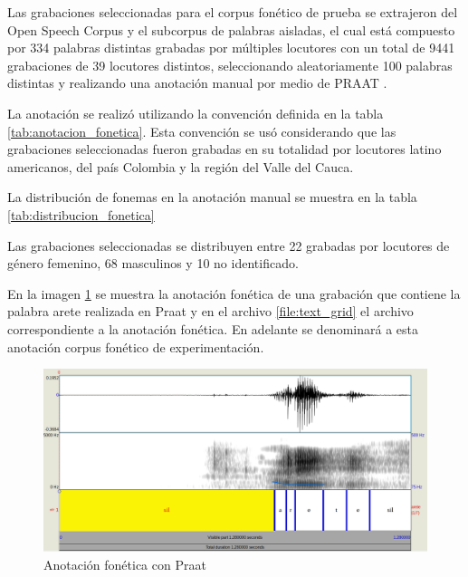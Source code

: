 

Las grabaciones seleccionadas para el corpus fonético de prueba se extrajeron del Open Speech Corpus \cite{Collazos2015} y el subcorpus de palabras aisladas, el cual está compuesto por 334 palabras distintas grabadas por múltiples locutores con un total de 9441 grabaciones de 39 locutores distintos, seleccionando aleatoriamente 100 palabras distintas y realizando una anotación manual por medio de PRAAT \cite{Praat}.

La anotación se realizó utilizando la convención definida en la tabla \ref{tab:anotacion_fonetica}. Esta convención se us\'o considerando que las grabaciones seleccionadas fueron grabadas en su totalidad por locutores latino americanos, del país Colombia y la región del Valle del Cauca. 



La distribución de fonemas en la anotación manual se muestra en la tabla \ref{tab:distribucion_fonetica}



Las grabaciones seleccionadas se distribuyen entre 22 grabadas por locutores de género femenino, 68 masculinos y 10 no identificado.

En la imagen \ref{img:anotacion_fonetica_praat} se muestra la anotación fonética de una grabación que contiene la palabra arete realizada en Praat y en el archivo \ref{file:text_grid} el archivo correspondiente a la anotación fonética. En adelante se denominará a esta anotación corpus fonético de experimentación.


\begin{figure}[H]
\caption{Anotación fonética con Praat}
\label{img:anotacion_fonetica_praat}
\includegraphics[width=\textwidth]{imagenes/03_01_anotacion_fonetica.png}
\end{figure}

